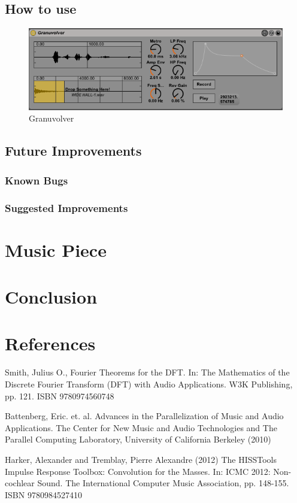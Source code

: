 \documentclass{article}
\begin{document}
		\subsection{How to use}
			\begin{figure}[h!]
		  \centering
	    \includegraphics[width=1\textwidth]{images/Granuvolver}
		  \caption{Granuvolver}
			\end{figure}


		\subsection{Future Improvements}
			\subsubsection{Known Bugs}
			\subsubsection{Suggested Improvements}
	\section{Music Piece}
	\section{Conclusion}
	\section{References}
		\begin{thebibliography}{99}
		 Smith, Julius O., Fourier Theorems for the DFT. In: The Mathematics of the Discrete Fourier Transform (DFT) with Audio Applications. W3K Publishing, pp. 121. ISBN 9780974560748

		 Battenberg, Eric. et. al. Advances in the Parallelization of Music and Audio Applications. The Center for New Music and Audio Technologies and The Parallel Computing Laboratory, University of California Berkeley (2010)

		 Harker, Alexander and Tremblay, Pierre Alexandre (2012) The HISSTools Impulse Response Toolbox: Convolution for the Masses. In: ICMC 2012: Non-cochlear Sound. The International Computer Music Association, pp. 148-155. ISBN 9780984527410
		\end{thebibliography}
\end{document}

